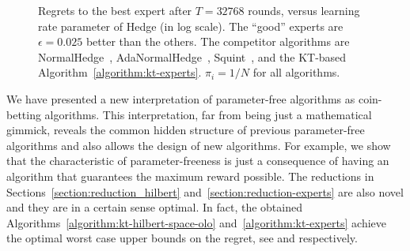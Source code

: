 \begin{figure}[t]
\centering
{}
\caption{\footnotesize{Regrets to the best expert after $T = 32768$ rounds, versus learning rate parameter of Hedge (in log scale). The ``good'' experts are $\epsilon=0.025$ better than the others. The competitor algorithms are NormalHedge~\cite{Chaudhuri-Freund-Hsu-2009}, AdaNormalHedge~\cite{Luo-Schapire-2015}, Squint~\cite{Koolen-van-Erven-2015}, and the KT-based Algorithm~\ref{algorithm:kt-experts}. $\pi_i=1/N$ for all algorithms.}}
\label{fig:exp_lea}
\end{figure}

We have presented a new interpretation of parameter-free algorithms as coin-betting algorithms. This interpretation, far from being just a mathematical gimmick, reveals
the common hidden structure of previous parameter-free algorithms and also allows the design of new algorithms. For example,
we show that the characteristic of parameter-freeness is just a consequence of
having an algorithm that guarantees the maximum reward possible.
The reductions in Sections~\ref{section:reduction_hilbert} and~\ref{section:reduction-experts} are also novel and they are in a
certain sense optimal. In fact, the obtained
Algorithms~\ref{algorithm:kt-hilbert-space-olo} and~\ref{algorithm:kt-experts}
achieve the optimal worst case upper bounds on the regret, see \cite{Streeter-McMahan-2012,Orabona-2013}
and \cite{Cesa-Bianchi-Lugosi-2006} respectively.

